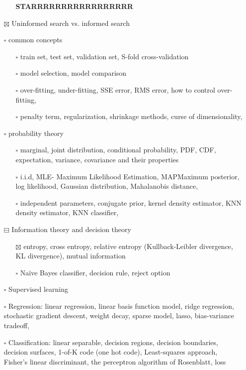 \documentclass[11pt]{article}
\begin{document}
\begin{itemize}
\begin{itemize}
\textbf{STARRRRRRRRRRRRRRRRR}
\end{itemize}
\item[{$\boxtimes$}] Uninformed search vs. informed search
\item[{$\square$}] common concepts
\begin{itemize}
\item[{$\square$}] train set, test set, validation set, S-fold cross-validation
\item[{$\square$}] model selection, model comparison
\item[{$\square$}] over-fitting, under-fitting, SSE error, RMS error, how to control over-fitting,
\item[{$\square$}] penalty term, regularization, shrinkage methods, curse of dimensionality,
\end{itemize}
\item[{$\square$}] probability theory
\begin{itemize}
\item[{$\square$}] marginal, joint distribution, conditional probability, PDF, CDF, expectation, variance,
covariance and their properties
\item[{$\square$}] i.i.d, MLE- Maximum Likelihood Estimation, MAPMaximum posterior, log
likelihood, Gaussian distribution, Mahalanobis distance,
\item[{$\square$}] independent parameters, conjugate prior, kernel density estimator, KNN density
estimator, KNN classifier,
\end{itemize}
\item[{$\boxminus$}] Information theory and decision theory
\begin{itemize}
\item[{$\boxtimes$}] entropy, cross entropy, relative entropy (Kullback-Leibler divergence, KL divergence),
mutual information
\item[{$\square$}] Naïve Bayes classifier, decision rule, reject option
\end{itemize}
\item[{$\square$}] Supervised learning
\item[{$\square$}] Regression: linear regression, linear basis function model, ridge regression,
stochastic gradient descent, weight decay, sparse model, lasso,
bias-variance tradeoff,
\item[{$\square$}] Classification: linear separable, decision regions, decision boundaries,
decision surfaces, 1-of-K code (one hot code), Least-squares approach,
Fisher’s linear discriminant, the perceptron algorithm of Rosenblatt, loss

\end{itemize}
\end{document}
